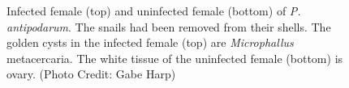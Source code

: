 \documentclass[
  letterpaper,
]{book}
\begin{document}
\begin{figure}


\caption[Infected female (top) and uninfected female (bottom) of
\emph{P. antipodarum}]{\label{fig-4.2}Infected female (top) and
uninfected female (bottom) of \emph{P. antipodarum}. The snails had been
removed from their shells. The golden cysts in the infected female (top)
are \emph{Microphallus} metacercaria. The white tissue of the uninfected
female (bottom) is ovary. (Photo Credit: Gabe Harp)}

\end{figure}%
\end{document}
